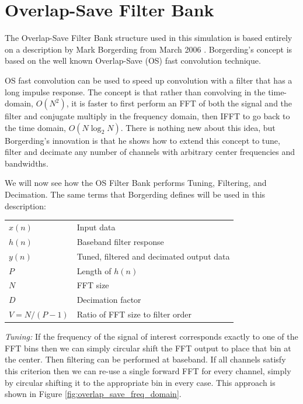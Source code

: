 \documentclass[12pt]{article}
\begin{document}
\section{Overlap-Save Filter Bank}
\label{sec:os_filter_bank}
The Overlap-Save Filter Bank structure used in this simulation is based
entirely on a description by Mark Borgerding from March 2006
\cite{Borgerding1}.  Borgerding's concept is based on the well known
Overlap-Save (OS) fast convolution technique.

OS fast convolution can be used to speed up convolution with
a filter that has a long impulse response. The concept is that rather than
convolving in the time-domain, $O(N^2)$, it is faster to first
perform an FFT of both the signal and the filter and conjugate multiply in the
frequency domain, then IFFT to go back to the time domain, $O(N\log_2N)$.
There is nothing new about this idea, but Borgerding's innovation is that he
shows how to extend this concept to tune, filter and decimate any number of
channels with arbitrary center frequencies and bandwidths.

We will now see how the OS Filter Bank performs Tuning, Filtering, and
Decimation. The same terms that Borgerding defines will be used in this
description:

\begin{center}
\begin{tabular}{ll}
    $x(n)$        & Input data \\
    $h(n)$        & Baseband filter response \\
    $y(n)$        & Tuned, filtered and decimated output data \\
    $P$           & Length of $h(n)$ \\
    $N$           & FFT size \\
    $D$           & Decimation factor \\
    $V = N/(P-1)$ & Ratio of FFT size to filter order \\
\end{tabular}
\end{center}

\emph{Tuning:} If the frequency of the signal of interest corresponds exactly
to one of the FFT bins then we can simply circular shift the FFT output to
place that bin at the center. Then filtering can be performed at baseband.  If
all channels satisfy this criterion then we can re-use a single forward FFT for
every channel, simply by circular shifting it to the appropriate bin in every
case.  This approach is shown in Figure \ref{fig:overlap_save_freq_domain}.
\end{document}
